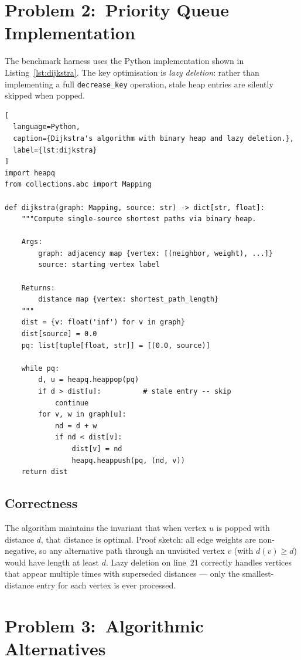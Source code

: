 \documentclass[11pt,a4paper]{article}
\begin{document}
\section{Problem 2:\ Priority Queue Implementation}

The benchmark harness uses the Python implementation shown in Listing~\ref{lst:dijkstra}.
The key optimisation is \emph{lazy deletion}: rather than implementing a full
\texttt{decrease\_key} operation, stale heap entries are silently skipped when popped.

\begin{lstlisting}[
  language=Python,
  caption={Dijkstra's algorithm with binary heap and lazy deletion.},
  label={lst:dijkstra}
]
import heapq
from collections.abc import Mapping

def dijkstra(graph: Mapping, source: str) -> dict[str, float]:
    """Compute single-source shortest paths via binary heap.

    Args:
        graph: adjacency map {vertex: [(neighbor, weight), ...]}
        source: starting vertex label

    Returns:
        distance map {vertex: shortest_path_length}
    """
    dist = {v: float('inf') for v in graph}
    dist[source] = 0.0
    pq: list[tuple[float, str]] = [(0.0, source)]

    while pq:
        d, u = heapq.heappop(pq)
        if d > dist[u]:          # stale entry -- skip
            continue
        for v, w in graph[u]:
            nd = d + w
            if nd < dist[v]:
                dist[v] = nd
                heapq.heappush(pq, (nd, v))
    return dist
\end{lstlisting}

\subsection{Correctness}

The algorithm maintains the invariant that when vertex $u$ is popped with distance $d$, that
distance is optimal. Proof sketch: all edge weights are non-negative, so any alternative path
through an unvisited vertex $v$ (with $d(v) \ge d$) would have length at least $d$. Lazy
deletion on line~21 correctly handles vertices that appear multiple times with superseded
distances --- only the smallest-distance entry for each vertex is ever processed.

\section{Problem 3:\ Algorithmic Alternatives}
\end{document}
